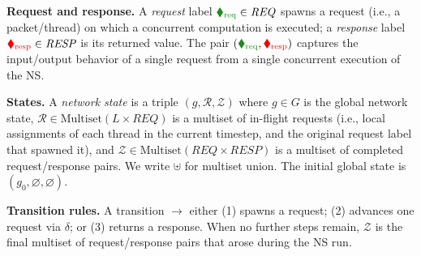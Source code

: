 
\noindent
\textbf{Request and response.}
A \emph{request} label ${\color{ForestGreen}\blacklozenge_\text{req}}\in\mathit{REQ}$ spawns a request (i.e., a packet/thread) on which a concurrent computation is executed; a \emph{response} label ${\color{red}\blacklozenge_\text{resp}}\in\mathit{RESP}$ is its returned value. The pair $({\color{ForestGreen}\blacklozenge_\text{req}},{\color{red}\blacklozenge_\text{resp}})$ captures the input/output behavior of a single request from a single concurrent execution of the NS.



\smallskip
\noindent
\textbf{States.}
A \emph{network state} is a triple $(g,\mathcal{R},\mathcal{Z})$ where
$g \in G$ is the global network state,
$\mathcal{R} \in \mathrm{Multiset}(L \times \mathit{REQ})$ is a multiset of in-flight requests (i.e., local assignments of each thread in the current timestep, and the original request label that spawned it),
and $\mathcal{Z} \in \mathrm{Multiset}(\mathit{REQ} \times \mathit{RESP})$ is a multiset of completed request/response pairs.
%
We write $\uplus$ for multiset union.
%
The initial global state is $(g_0, \varnothing, \varnothing)$.




\smallskip
\noindent
\textbf{Transition rules.}
A transition $\longrightarrow$ either (1) spawns a request; (2) advances one request via $\delta$; or (3) returns a response. When no further steps remain, $\mathcal{Z}$ is the final multiset of request/response pairs that arose during the NS run.








